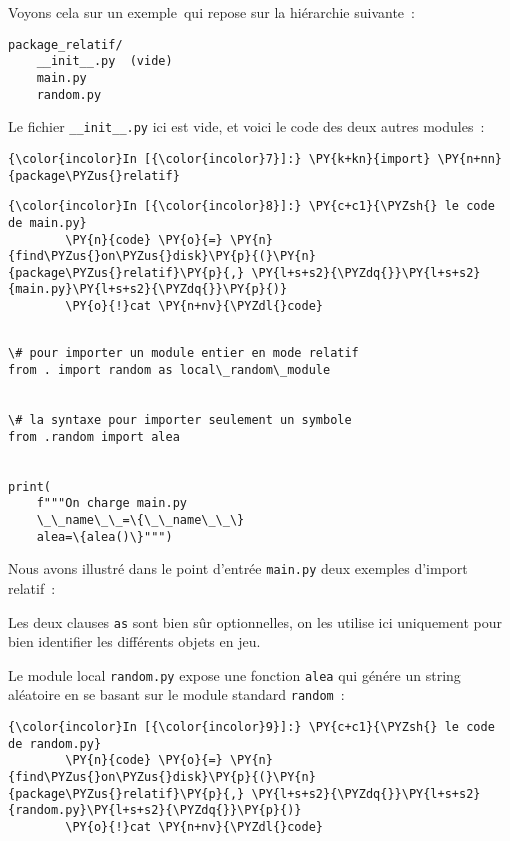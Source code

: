 Voyons cela sur un exemple~qui repose sur la hiérarchie suivante~:

\begin{verbatim}
package_relatif/
    __init__.py  (vide)
    main.py
    random.py
\end{verbatim}

    Le fichier \texttt{\_\_init\_\_.py} ici est vide, et voici le code des
deux autres modules~:

    \begin{Verbatim}[commandchars=\\\{\}]
{\color{incolor}In [{\color{incolor}7}]:} \PY{k+kn}{import} \PY{n+nn}{package\PYZus{}relatif}
\end{Verbatim}


    \begin{Verbatim}[commandchars=\\\{\}]
{\color{incolor}In [{\color{incolor}8}]:} \PY{c+c1}{\PYZsh{} le code de main.py}
        \PY{n}{code} \PY{o}{=} \PY{n}{find\PYZus{}on\PYZus{}disk}\PY{p}{(}\PY{n}{package\PYZus{}relatif}\PY{p}{,} \PY{l+s+s2}{\PYZdq{}}\PY{l+s+s2}{main.py}\PY{l+s+s2}{\PYZdq{}}\PY{p}{)}
        \PY{o}{!}cat \PY{n+nv}{\PYZdl{}code}
\end{Verbatim}


    \begin{Verbatim}[commandchars=\\\{\}]

\# pour importer un module entier en mode relatif
from . import random as local\_random\_module


\# la syntaxe pour importer seulement un symbole
from .random import alea


print(
    f"""On charge main.py
    \_\_name\_\_=\{\_\_name\_\_\}
    alea=\{alea()\}""")

    \end{Verbatim}

    Nous avons illustré dans le point d'entrée \texttt{main.py} deux
exemples d'import relatif~:

    Les deux clauses \texttt{as} sont bien sûr optionnelles, on les utilise
ici uniquement pour bien identifier les différents objets en jeu.

    Le module local \texttt{random.py} expose une fonction \texttt{alea} qui
génére un string aléatoire en se basant sur le module standard
\texttt{random}~:

    \begin{Verbatim}[commandchars=\\\{\}]
{\color{incolor}In [{\color{incolor}9}]:} \PY{c+c1}{\PYZsh{} le code de random.py}
        \PY{n}{code} \PY{o}{=} \PY{n}{find\PYZus{}on\PYZus{}disk}\PY{p}{(}\PY{n}{package\PYZus{}relatif}\PY{p}{,} \PY{l+s+s2}{\PYZdq{}}\PY{l+s+s2}{random.py}\PY{l+s+s2}{\PYZdq{}}\PY{p}{)}
        \PY{o}{!}cat \PY{n+nv}{\PYZdl{}code}
\end{Verbatim}


